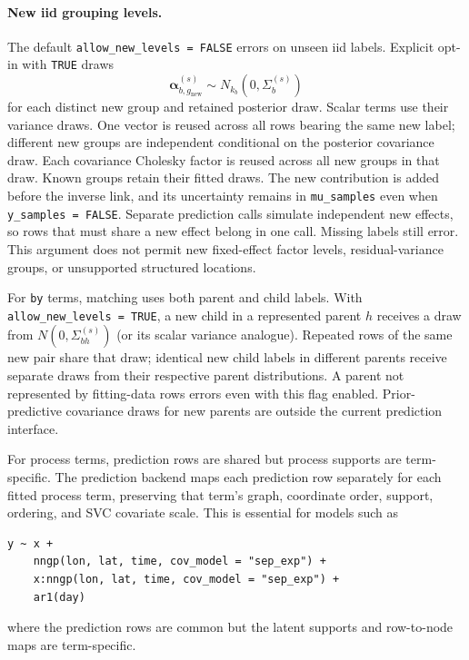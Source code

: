 \documentclass[11pt]{article}
\newcommand{\balpha}{\bm{\alpha}}
\begin{document}
\paragraph{New iid grouping levels.}
The default \texttt{allow\_new\_levels = FALSE} errors on unseen iid labels. Explicit opt-in with \texttt{TRUE} draws
\begin{equation}
 \balpha_{b,g_{\mathrm{new}}}^{(s)}\sim N_{k_b}(0,\Sigma_b^{(s)})
\end{equation}
for each distinct new group and retained posterior draw. Scalar terms use their variance draws. One vector is reused across all rows bearing the same new label; different new groups are independent conditional on the posterior covariance draw. Each covariance Cholesky factor is reused across all new groups in that draw. Known groups retain their fitted draws. The new contribution is added before the inverse link, and its uncertainty remains in \texttt{mu\_samples} even when \texttt{y\_samples = FALSE}. Separate prediction calls simulate independent new effects, so rows that must share a new effect belong in one call. Missing labels still error. This argument does not permit new fixed-effect factor levels, residual-variance groups, or unsupported structured locations.

For \texttt{by} terms, matching uses both parent and child labels. With \texttt{allow\_new\_levels = TRUE}, a new child in a represented parent $h$ receives a draw from $N(0,\Sigma_{bh}^{(s)})$ (or its scalar variance analogue). Repeated rows of the same new pair share that draw; identical new child labels in different parents receive separate draws from their respective parent distributions. A parent not represented by fitting-data rows errors even with this flag enabled. Prior-predictive covariance draws for new parents are outside the current prediction interface.

For process terms, prediction rows are shared but process supports are term-specific. The prediction backend maps each prediction row separately for each fitted process term, preserving that term's graph, coordinate order, support, ordering, and SVC covariate scale. This is essential for models such as
\begin{verbatim}
y ~ x +
    nngp(lon, lat, time, cov_model = "sep_exp") +
    x:nngp(lon, lat, time, cov_model = "sep_exp") +
    ar1(day)
\end{verbatim}
where the prediction rows are common but the latent supports and row-to-node maps are term-specific.
\end{document}
